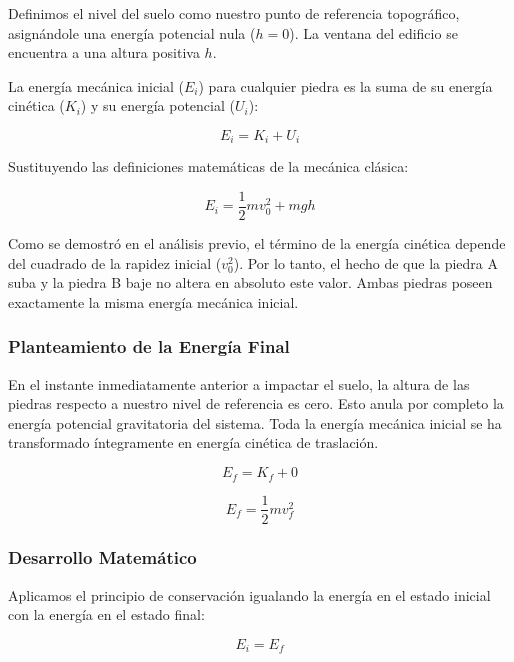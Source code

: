 \documentclass[12pt, a4paper]{article}
\begin{document}
Definimos el nivel del suelo como nuestro punto de referencia topográfico, asignándole una energía potencial nula ($h = 0$). La ventana del edificio se encuentra a una altura positiva $h$. 

La energía mecánica inicial ($E_i$) para cualquier piedra es la suma de su energía cinética ($K_i$) y su energía potencial ($U_i$):

\begin{equation}
E_i = K_i + U_i
\end{equation}

Sustituyendo las definiciones matemáticas de la mecánica clásica:

\begin{equation}
E_i = \frac{1}{2} m v_0^2 + m g h
\end{equation}

Como se demostró en el análisis previo, el término de la energía cinética depende del cuadrado de la rapidez inicial ($v_0^2$). Por lo tanto, el hecho de que la piedra A suba y la piedra B baje no altera en absoluto este valor. Ambas piedras poseen exactamente la misma energía mecánica inicial.

\subsubsection*{Planteamiento de la Energía Final}

En el instante inmediatamente anterior a impactar el suelo, la altura de las piedras respecto a nuestro nivel de referencia es cero. Esto anula por completo la energía potencial gravitatoria del sistema. Toda la energía mecánica inicial se ha transformado íntegramente en energía cinética de traslación.

\begin{equation}
E_f = K_f + 0
\end{equation}

\begin{equation}
E_f = \frac{1}{2} m v_f^2
\end{equation}

\subsubsection*{Desarrollo Matemático}

Aplicamos el principio de conservación igualando la energía en el estado inicial con la energía en el estado final:

\begin{equation}
E_i = E_f
\end{equation}
\end{document}
